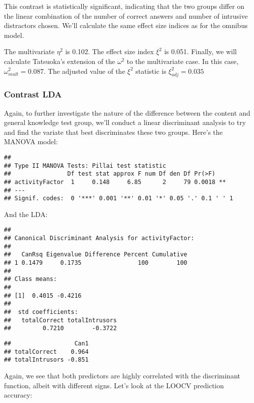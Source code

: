 \documentclass[11pt,]{article}
\begin{document}
This contrast is statistically significant, indicating that the two
groups differ on the linear combination of the number of correct answers
and number of intrusive distractors chosen. We'll calculate the same
effect size indices as for the omnibus model.

The multivariate \(\eta^2\) is 0.102. The effect size index \(\xi^2\) is
0.051. Finally, we will calculate Tatsuoka's
\citep[1970; according to][]{hubertyAppliedMANOVADiscriminant2006}
extension of the \(\omega^2\) to the multivariate case. In this case,
\(\omega^2_{mult} = 0.087\). The adjusted value of the \(\xi^2\)
statistic is \(\xi^2_{adj} = 0.035\)

\hypertarget{contrast-lda}{%
\subsubsection{Contrast LDA}\label{contrast-lda}}

Again, to further investigate the nature of the difference between the
content and general knowledge test group, we'll conduct a linear
discriminant analysis to try and find the variate that best
discriminates these two groups. Here's the MANOVA model:

\begin{verbatim}
## 
## Type II MANOVA Tests: Pillai test statistic
##                Df test stat approx F num Df den Df Pr(>F)   
## activityFactor  1     0.148     6.85      2     79 0.0018 **
## ---
## Signif. codes:  0 '***' 0.001 '**' 0.01 '*' 0.05 '.' 0.1 ' ' 1
\end{verbatim}

And the LDA:

\begin{verbatim}
## 
## Canonical Discriminant Analysis for activityFactor:
## 
##   CanRsq Eigenvalue Difference Percent Cumulative
## 1 0.1479     0.1735                100        100
## 
## Class means:
## 
## [1]  0.4015 -0.4216
## 
##  std coefficients:
##   totalCorrect totalIntrusors 
##         0.7210        -0.3722
\end{verbatim}

\begin{verbatim}
##                  Can1
## totalCorrect    0.964
## totalIntrusors -0.851
\end{verbatim}

Again, we see that both predictors are highly correlated with the
discriminant function, albeit with different signs. Let's look at the
LOOCV prediction accuracy:
\end{document}
